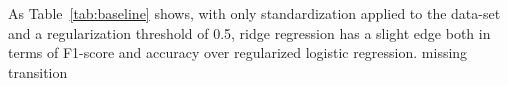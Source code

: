 \documentclass[10pt,conference,compsocconf]{IEEEtran}
\begin{document}
\begin{comment}
\begin{table}[ht]
\centering
\resizebox{\columnwidth}{!}{%
\begin{tabular}{lrrr|r|r|r|}
\cline{5-7}
 &
  \multicolumn{1}{c}{} &
  \multicolumn{1}{l}{} &
  \multicolumn{1}{l|}{} &
  \multicolumn{1}{l|}{Training} &
  \multicolumn{1}{l|}{Validation} &
  \multicolumn{1}{l|}{Testing} \\ \cline{2-7} 
\multicolumn{1}{l|}{} &
  \multicolumn{3}{c|}{Parameters} &
  \multicolumn{1}{l|}{F1-score} &
  \multicolumn{1}{l|}{F1-score} &
  \multicolumn{1}{l|}{F1-score} \\ \hline
\multicolumn{1}{|l|}{Methods} &
  \multicolumn{1}{l|}{Gamma} &
  \multicolumn{1}{l|}{Lambda} &
  \multicolumn{1}{l|}{Max\_iters} &
  \multicolumn{1}{l|}{Accuracy} &
  \multicolumn{1}{l|}{Accuracy} &
  \multicolumn{1}{l|}{Accuracy} \\ \hline
\multicolumn{1}{|l|}{\multirow{2}{*}{\begin{tabular}[c]{@{}l@{}}Regularized logistic \\ regression\end{tabular}}} &
  \multicolumn{1}{r|}{0.4} &
  \multicolumn{1}{r|}{5e-2} &
  6000 &
  44.79\% &
  44.80\% &
  44.90\% \\
\multicolumn{1}{|l|}{} &
  \multicolumn{1}{r|}{} &
  \multicolumn{1}{r|}{} &
   &
  72.80\% &
  72.80\% &
  72.90\% \\ \hline
\multicolumn{1}{|l|}{\multirow{2}{*}{Ridge Regression}} &
  \multicolumn{1}{r|}{-} &
  \multicolumn{1}{r|}{1e-4} &
  - &
  56.70\% &
  56.70\% &
  56.70\% \\
\multicolumn{1}{|l|}{} &
  \multicolumn{1}{r|}{} &
  \multicolumn{1}{r|}{} &
   &
  74.43\% &
  74.42\% &
  74.40\% \\ \hline
\end{tabular}%
}
\caption{Parameters, F1-score and accuracy results for the initial implementation
using the entire data-set.}
\label{tab:baseline}
\end{table}
\end{comment}

As Table~\ref{tab:baseline} shows, with only standardization applied to 
the data-set and a regularization threshold of 0.5, ridge regression has 
a slight edge both in terms of F1-score and accuracy over regularized 
logistic regression.
missing transition
\end{document}
